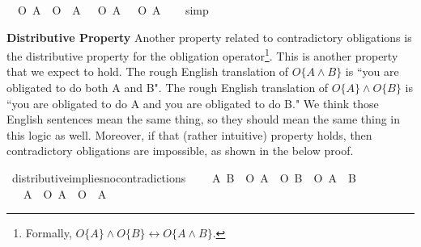 \begin{isabellebody}
\begin{isamarkuptext}
\medskip%
\end{isamarkuptext}\isamarkuptrue%
\isamarkupfalse%
\ {\isachardoublequoteopen}{\isasymTurnstile}\ {\isacharparenleft}{\isacharparenleft}O\ {\isacharbraceleft}A{\isacharbraceright}\ \isactrlbold {\isasymand}\ O\ {\isacharbraceleft}\isactrlbold {\isasymnot}\ A{\isacharbraceright}{\isacharparenright}\ \isactrlbold {\isasymequiv}\ {\isacharparenleft}\isactrlbold {\isasymnot}\ {\isacharparenleft}O\ {\isacharbraceleft}A{\isacharbraceright}\ \isactrlbold {\isasymrightarrow}\ \isactrlbold {\isasymnot}\ O\ {\isacharbraceleft}\isactrlbold {\isasymnot}A{\isacharbraceright}{\isacharparenright}{\isacharparenright}{\isacharparenright}{\isachardoublequoteclose}\isanewline
%
\isadelimproof
\ \ %
\endisadelimproof
%
\isatagproof
{}\isamarkupfalse%
\ simp%
\endisatagproof
{\isafoldproof}%
%
\isadelimproof
%
\endisadelimproof
%
\begin{isamarkuptext}%
\textbf{Distributive Property} Another property related to contradictory obligations is the distributive property for the obligation
operator\footnote{Formally, $O\{A\} \wedge O\{B\} \longleftrightarrow O\{A \wedge B\}$.}. This is 
another property that we expect to hold. The rough English translation of  $O \{ A \wedge B \} $ is ``you are obligated to 
do both A and B". The rough English translation of $O\{A\} \wedge O\{B\}$ is ``you are obligated to do A 
and you are obligated to do B." We think those English sentences mean the same thing, so they should mean 
the same thing in this logic as well. Moreover, if that (rather intuitive) property holds, then contradictory
obligations are impossible, as shown in the below proof.%
\end{isamarkuptext}\isamarkuptrue%
\isamarkupfalse%
\ distributive{\isacharunderscore}implies{\isacharunderscore}no{\isacharunderscore}contradictions{\isacharcolon}\ \isanewline
\ \ \ {\isachardoublequoteopen}{\isasymforall}A\ B{\isachardot}\ {\isasymTurnstile}\ {\isacharparenleft}{\isacharparenleft}O\ {\isacharbraceleft}A{\isacharbraceright}\ \isactrlbold {\isasymand}\ O\ {\isacharbraceleft}B{\isacharbraceright}{\isacharparenright}\ \isactrlbold {\isasymequiv}\ O\ {\isacharbraceleft}A\ \isactrlbold {\isasymand}\ B{\isacharbraceright}{\isacharparenright}{\isachardoublequoteclose}\isanewline
\ \ \ {\isachardoublequoteopen}{\isasymforall}A{\isachardot}\ {\isasymTurnstile}{\isacharparenleft}\ \isactrlbold {\isasymnot}{\isacharparenleft}O\ {\isacharbraceleft}A{\isacharbraceright}\ \isactrlbold {\isasymand}\ O\ {\isacharbraceleft}\isactrlbold {\isasymnot}\ A{\isacharbraceright}{\isacharparenright}{\isacharparenright}\ {\isachardoublequoteclose}\isanewline

\end{isabellebody}
